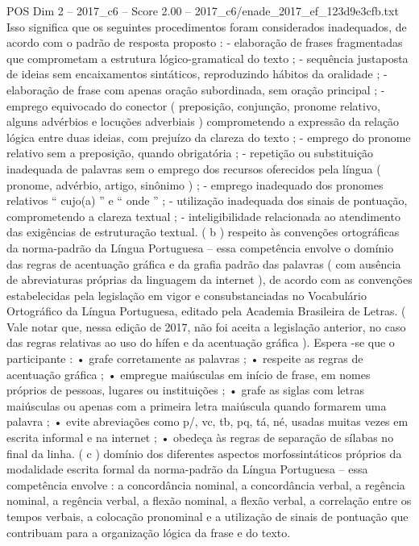 \begin{textsample}{POS Dim 2 – 2017\_c6 – Score 2.00 – 2017\_c6/enade\_2017\_ef\_123d9e3cfb.txt}
Isso significa que os seguintes procedimentos foram considerados inadequados, de acordo com o padrão de resposta proposto : - elaboração de frases fragmentadas que comprometam a estrutura lógico-gramatical do texto ; - sequência justaposta de ideias sem encaixamentos sintáticos, reproduzindo hábitos da oralidade ; - elaboração de frase com apenas oração subordinada, sem oração principal ; - emprego equivocado do conector ( preposição, conjunção, pronome relativo, alguns advérbios e locuções adverbiais ) comprometendo a expressão da relação lógica entre duas ideias, com prejuízo da clareza do texto ; - emprego do pronome relativo sem a preposição, quando obrigatória ; - repetição ou substituição inadequada de palavras sem o emprego dos recursos oferecidos pela língua ( pronome, advérbio, artigo, sinônimo ) ; - emprego inadequado dos pronomes relativos “ cujo(a) ” e “ onde ” ; - utilização inadequada dos sinais de pontuação, comprometendo a clareza textual ; - inteligibilidade relacionada ao atendimento das exigências de estruturação textual. ( b ) respeito às convenções ortográficas da norma-padrão da Língua Portuguesa – essa competência envolve o domínio das regras de acentuação gráfica e da grafia padrão das palavras ( com ausência de abreviaturas próprias da linguagem da internet ), de acordo com as convenções estabelecidas pela legislação em vigor e consubstanciadas no Vocabulário Ortográfico da Língua Portuguesa, editado pela Academia Brasileira de Letras. ( Vale notar que, nessa edição de 2017, não foi aceita a legislação anterior, no caso das regras relativas ao uso do hífen e da acentuação gráfica ).
Espera -se que o participante : • grafe corretamente as palavras ; • respeite as regras de acentuação gráfica ; • empregue maiúsculas em início de frase, em nomes próprios de pessoas, lugares ou instituições ; • grafe as siglas com letras maiúsculas ou apenas com a primeira letra maiúscula quando formarem uma palavra ; • evite abreviações como p/, vc, tb, pq, tá, né, usadas muitas vezes em escrita informal e na internet ; • obedeça às regras de separação de sílabas no final da linha. ( c ) domínio dos diferentes aspectos morfossintáticos próprios da modalidade escrita formal da norma-padrão da Língua Portuguesa – essa competência envolve : a concordância nominal, a concordância verbal, a regência nominal, a regência verbal, a flexão nominal, a flexão verbal, a correlação entre os tempos verbais, a colocação pronominal e a utilização de sinais de pontuação que contribuam para a organização lógica da frase e do texto.

\end{textsample}
